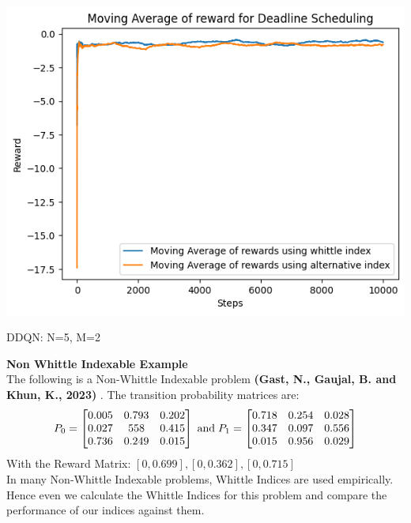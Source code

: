 \documentclass{slides}
\begin{document}
{{\begin{center}
\includegraphics[scale=0.75]{rewards_comparison_deadline.png}
\end{center}
\begin{small}
\vspace{-10mm}
\hspace{100mm}DDQN: N=5, M=2\end{small}
\newpage
\textbf{Non Whittle Indexable Example}\\
The following is a Non-Whittle Indexable problem \textbf{(Gast, N., Gaujal, B. and Khun, K., 2023)} . The transition probability matrices are: 
 \begin{align*}
P_0=
\begin{bmatrix}
0.005 & 0.793 & 0.202\\
0.027 & 558 & 0.415 \\
0.736&0.249&0.015
\end{bmatrix}
\hspace{1mm} \text{and} \hspace{1mm}
P_1=
\begin{bmatrix}
0.718 & 0.254 & 0.028\\
0.347 & 0.097 & 0.556 \\
0.015&0.956&0.029
\end{bmatrix}
\end{align*}
With the Reward Matrix: $[0,0.699],[0,0.362],[0,0.715]$\\
In many Non-Whittle Indexable problems, Whittle Indices are used empirically. Hence
even we calculate the Whittle Indices for this problem and compare the performance of our indices against
them.

}}
\end{document}
